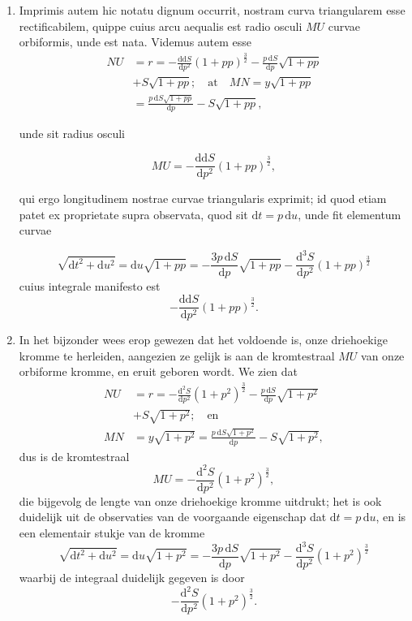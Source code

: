 \documentclass[10pt,a4paper]{article}
\newcommand{\switchenum}{\setcounter{enumi}{\arabic{enumi}-1}\switchcolumn}
\def\D{\mathrm{d}}
\begin{document}
\begin{paracol}{2}
\begin{enumerate}[topsep=1px]
		\switchcolumn*
		
		\item Imprimis autem hic notatu dignum occurrit, nostram curva triangularem esse rectificabilem, quippe cuius arcu aequalis est radio osculi $MU$ curvae orbiformis, unde est nata. Videmus autem esse
		\begin{align*}
			NU &= r = -\frac{\D \D S}{\D p^2}(1+pp)^\frac{3}{2}-\frac{p\,\D S}{\D p}\sqrt{1+pp}\\
			& +S\sqrt{1+pp}; \quad \text{at} \quad MN = y\sqrt{1+pp}\\
			&= \frac{p\, \D S\sqrt{1+pp}}{\D p}-S\sqrt{1+pp},
		\end{align*}
		
		unde sit radius osculi
		
		\[
			MU = -\frac{\D \D S}{\D p^2}(1+pp)^\frac{3}{2},
		\]
		\par qui ergo longitudinem nostrae curvae triangularis exprimit; id quod etiam patet ex proprietate supra observata, quod sit $\D t = p\, \D u$, unde fit elementum curvae
		
		\[
			\sqrt{\D t^2+\D u^2} = \D u\sqrt{1+pp} = -\frac{3p\, \D S}{\D p}\sqrt{1+pp}-\frac{\D^3S}{\D p^2}(1+pp)^\frac{3}{2}
		\]
		cuius integrale manifesto est
		\[
			-\frac{\D \D S}{\D p^2}(1+pp)^\frac{3}{2}.
		\]
		
		\switchenum
		\item In het bijzonder wees erop gewezen dat het voldoende is, onze driehoekige kromme te herleiden, aangezien ze gelijk is aan de kromtestraal $MU$ van onze orbiforme kromme, en eruit geboren wordt. We zien dat
		\begin{align*}
			NU &= r = -\frac{\D^2 S}{\D p^2}(1+p^2)^\frac{3}{2}-\frac{p\,\D S}{\D p}\sqrt{1+p^2}\\
			& +S\sqrt{1+p^2}; \quad \text{en}\\
			MN & = y\sqrt{1+p^2} = \frac{p\, \D S\sqrt{1+p^2}}{\D p}-S\sqrt{1+p^2},
		\end{align*}
		dus is de kromtestraal
		\[
			MU = -\frac{\D^2 S}{\D p^2}(1+p^2)^\frac{3}{2},
		\]
		die bijgevolg de lengte van onze driehoekige kromme uitdrukt; het is ook duidelijk uit de observaties van de voorgaande eigenschap dat $\D t = p\, \D u$, en is een elementair stukje van de kromme
		\[
			\sqrt{\D t^2+\D u^2} = \D u\sqrt{1+p^2} = -\frac{3p\, \D S}{\D p}\sqrt{1+p^2}-\frac{\D^3S}{\D p^2}(1+p^2)^\frac{3}{2}
		\]
		waarbij de integraal duidelijk gegeven is door
		\[
			-\frac{\D^2 S}{\D p^2}(1+p^2)^\frac{3}{2}.
		\]


\end{enumerate}
\end{paracol}
\end{document}
